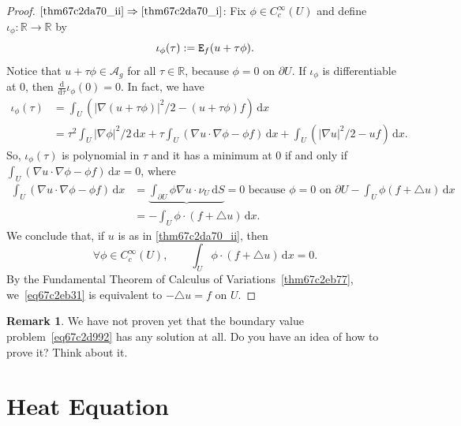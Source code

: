\documentclass[a4paper,9pt]{amsart}
\newcommand{\scr}[1]{\mathscr{#1}}
\newcommand{\R}{\mathbb{R}}	%
\newcommand{\dd}{\mathrm{d}}	%
\newcommand{\did}{\,\mathrm{d}}	%
\newcommand{\de}{\partial}		%
\newcommand{\THEN}{\Rightarrow}	%
\newcommand{\laplacian}{\triangle}
\newcommand{\grad}{\nabla}
\theoremstyle{plain}
\theoremstyle{definition}
\newtheorem{remark}[proposition]{Remark}
\theoremstyle{remark}
\begin{document}
\begin{proof}
	$\ref{thm67c2da70_ii}\THEN\ref{thm67c2da70_i}$:
	Fix $\phi\in C^\infty_c(U)$ and define $\iota_\phi:\R\to\R$ by
	\[
	\iota_\phi(\tau) := \mathtt{E}_f(u + \tau\phi) .
	\]
	Notice that $u+\tau\phi\in\scr A_g$ for all $\tau\in\R$,
	because $\phi=0$ on $\de U$.
	If $\iota_\phi$ is differentiable at $0$, then $\frac{\dd}{\dd \tau}\iota_\phi(0) = 0$.
	In fact, we have
	\begin{align*}
	 	\iota_\phi(\tau)
		&= \int_U (|\grad(u+\tau\phi)|^2/2 - (u+\tau\phi)f) \did x \\
		&= \tau^2 \int_U |\grad\phi|^2/2 \did x
			+ \tau \int_U (\grad u\cdot\grad\phi - \phi f) \did x 
			+ \int_U (|\grad u|^2/2 - uf) \did x .
	\end{align*}
	So, $\iota_\phi(\tau)$ is polynomial in $\tau$ and it has a minimum at $0$ if and only if
	$\int_U (\grad u\cdot\grad\phi - \phi f) \did x = 0$,
	where
	\begin{align*}
		\int_U (\grad u\cdot\grad\phi - \phi f) \did x
		&= \underbrace{\int_{\de U} \phi\grad u\cdot \nu_U \did S }{=0\text{ because }\phi=0\text{ on }\de U}
			- \int_U \phi(f+\laplacian u) \did x \\
		&= - \int_U \phi\cdot(f+\laplacian u) \did x .
	\end{align*}
	We conclude that, if $u$ is as in \ref{thm67c2da70_ii}, then 
	\begin{equation}\label{eq67c2eb31}
		\forall\phi\in C^\infty_c(U) ,
		\qquad
		\int_U \phi\cdot(f+\laplacian u) \did x = 0 .
	\end{equation}
	By the Fundamental Theorem of Calculus of Variations~\ref{thm67c2eb77}, 
	we~\eqref{eq67c2eb31} is equivalent to $-\laplacian u=f$ on $U$.
\end{proof}


\begin{remark}
	We have not proven yet that the boundary value problem~\eqref{eq67c2d992} has any solution at all.
	Do you have an idea of how to prove it? Think about it.
\end{remark}

\newpage
\section{Heat Equation}
\end{document}
